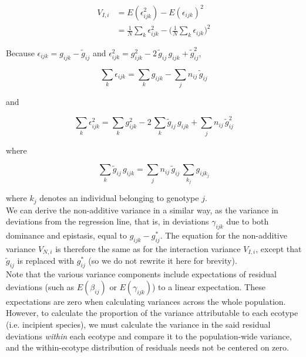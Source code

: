 \documentclass[]{article}
\begin{document}
\begin{align} 
V_{I,i} &= E(\epsilon_{ijk}^2) - E(\epsilon_{ijk})^2\\
&= \frac{1}{N} \sum_k \epsilon_{ijk}^2 - \bigg( \frac{1}{N} \sum_k \epsilon_{ijk} \bigg)^2
\end{align}

Because $\epsilon_{ijk} = g_{ijk} - \tilde{g}_{ij}$ and $\epsilon_{ijk}^2 = g_{ijk}^2 - 2 \, \tilde{g}_{ij} \, g_{ijk} + \tilde{g}_{ij}^2$, 

\begin{equation}
\sum_k \epsilon_{ijk} = \sum_k g_{ijk} - \sum_j n_{ij} \, \tilde{g}_{ij}
\end{equation}

and

\begin{equation}
\sum_k \epsilon_{ijk}^2 = \sum_k g_{ijk}^2 - 2 \, \sum_k \tilde{g}_{ij} \, g_{ijk} + \sum_j n_{ij} \, \tilde{g}_{ij}^2
\end{equation}

where 

\begin{equation}
\sum_k \tilde{g}_{ij} \, g_{ijk} = \sum_j n_{ij} \, \tilde{g}_{ij} \, \sum_{k_j} g_{ijk_j}
\end{equation}

where $k_j$ denotes an individual belonging to genotype $j$.\\

We can derive the non-additive variance in a similar way, as the variance in deviations from the regression line, that is, in deviations $\gamma_{ijk}$ due to both dominance and epistasis, equal to $g_{ijk} - g^*_{ij}$. The equation for the non-additive variance $V_{N,i}$ is therefore the same as for the interaction variance $V_{I,i}$, except that $\tilde{g}_{ij}$ is replaced with $g^*_{ij}$ (so we do not rewrite it here for brevity).\\

Note that the various variance components include expectations of residual deviations (such as $E(\beta_{ij})$ or $E(\gamma_{ijk})$) to a linear expectation. These expectations are zero when calculating variances across the whole population. However, to calculate the proportion of the variance attributable to each ecotype (i.e. incipient species), we must calculate the variance in the said residual deviations \textit{within} each ecotype and compare it to the population-wide variance, and the within-ecotype distribution of residuals needs not be centered on zero.\\
\end{document}
